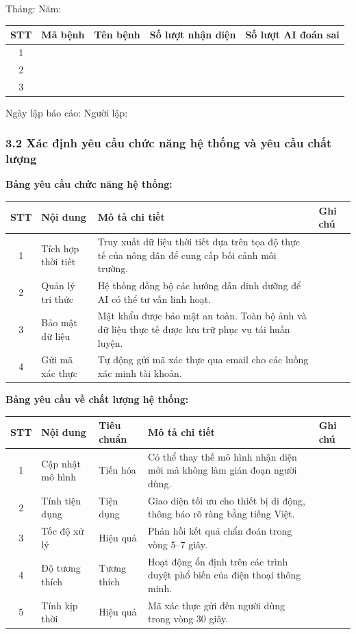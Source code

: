 ﻿\documentclass[12pt,a4paper]{article}
\begin{document}
\noindent Tháng: \dotfill \quad Năm: \dotfill

\begin{longtable}{|c|p{2cm}|p{4cm}|p{3cm}|p{3cm}|}
\hline
\rowcolor{headerblue}
\textbf{STT} & \textbf{Mã bệnh} & \textbf{Tên bệnh} & \textbf{Số lượt nhận diện} & \textbf{Số lượt AI đoán sai} \\
\hline
1 & & & & \\
\hline
2 & & & & \\
\hline
3 & & & & \\
\hline
\end{longtable}
\noindent Ngày lập báo cáo: \dotfill \quad Người lập: \dotfill

\hrulefill

\subsubsection*{3.2 Xác định yêu cầu chức năng hệ thống và yêu cầu chất lượng}

\textbf{Bảng yêu cầu chức năng hệ thống:}
\begin{longtable}{|c|p{3.5cm}|p{8.5cm}|p{1cm}|}
\hline
\rowcolor{headerblue}
\textbf{STT} & \textbf{Nội dung} & \textbf{Mô tả chi tiết} & \textbf{Ghi chú} \\
\hline
\endhead
1 & Tích hợp thời tiết & Truy xuất dữ liệu thời tiết dựa trên tọa độ thực tế của nông dân để cung cấp bối cảnh môi trường. & \\
\hline
2 & Quản lý tri thức & Hệ thống đồng bộ các hướng dẫn dinh dưỡng để AI có thể tư vấn linh hoạt. & \\
\hline
3 & Bảo mật dữ liệu & Mật khẩu được bảo mật an toàn. Toàn bộ ảnh và dữ liệu thực tế được lưu trữ phục vụ tái huấn luyện. & \\
\hline
4 & Gửi mã xác thực & Tự động gửi mã xác thực qua email cho các luồng xác minh tài khoản. & \\
\hline
\end{longtable}

\textbf{Bảng yêu cầu về chất lượng hệ thống:}
\begin{longtable}{|c|p{3cm}|p{2cm}|p{6cm}|p{1cm}|}
\hline
\rowcolor{headerblue}
\textbf{STT} & \textbf{Nội dung} & \textbf{Tiêu chuẩn} & \textbf{Mô tả chi tiết} & \textbf{Ghi chú} \\
\hline
\endhead
1 & Cập nhật mô hình & Tiến hóa & Có thể thay thế mô hình nhận diện mới mà không làm gián đoạn người dùng. & \\
\hline
2 & Tính tiện dụng & Tiện dụng & Giao diện tối ưu cho thiết bị di động, thông báo rõ ràng bằng tiếng Việt. & \\
\hline
3 & Tốc độ xử lý & Hiệu quả & Phản hồi kết quả chẩn đoán trong vòng 5--7 giây. & \\
\hline
4 & Độ tương thích & Tương thích & Hoạt động ổn định trên các trình duyệt phổ biến của điện thoại thông minh. & \\
\hline
5 & Tính kịp thời & Hiệu quả & Mã xác thực gửi đến người dùng trong vòng 30 giây. & \\
\hline
\end{longtable}
\end{document}
